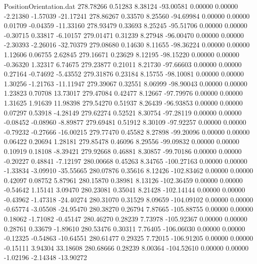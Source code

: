 \begin{filecontents}{PositionOrientation.dat}
 278.78266    0.51283    8.38124   -93.00581    0.00000    0.00000   -2.21380   -1.57039  -21.17241
 278.86267    0.33570    8.25560   -94.69984    0.00000    0.00000    0.01709   -0.04359  -11.33160
 278.93479    0.33693    8.25245   -95.51706    0.00000    0.00000   -0.30715    0.33817   -6.10157
 279.01471    0.31239    8.27948   -96.00470    0.00000    0.00000   -2.30393   -2.26016  -32.70379
 279.08680    0.14630    8.11655   -98.36224    0.00000    0.00000    1.12606    0.06755    2.62845
 279.16671    0.23629    8.12195   -98.15220    0.00000    0.00000   -0.36320    1.32317    6.74675
 279.23877    0.21011    8.21730   -97.66603    0.00000    0.00000    0.27164   -0.74692   -5.43552
 279.31876    0.23184    8.15755   -98.10081    0.00000    0.00000    1.30256   -1.21763  -11.11947
 279.39067    0.32551    8.06999   -98.90043    0.00000    0.00000    1.23823    0.70708   13.73017
 279.47084    0.42477    8.12667   -97.79976    0.00000    0.00000    1.31625    1.91639   11.98398
 279.54270    0.51937    8.26439   -96.93853    0.00000    0.00000    0.07297    0.53918   -4.28149
 279.62274    0.52521    8.30754   -97.28119    0.00000    0.00000   -0.08452   -0.08960   -8.89877
 279.69481    0.51912    8.30109   -97.92257    0.00000    0.00000   -0.79232   -0.27666  -16.00215
 279.77470    0.45582    8.27898   -99.20096    0.00000    0.00000    0.06422    0.20694    1.28181
 279.85478    0.46096    8.29556   -99.09832    0.00000    0.00000    0.10919    0.18108   -8.39421
 279.92668    0.46881    8.30857   -99.70186    0.00000    0.00000   -0.20227    0.48841   -7.12197
 280.00668    0.45263    8.34765  -100.27163    0.00000    0.00000   -1.33834   -3.09910  -35.55665
 280.07876    0.35616    8.12426  -102.83462    0.00000    0.00000    0.42097    0.08752    5.87961
 280.15870    0.38981    8.13126  -102.36459    0.00000    0.00000   -0.54642    1.15141    3.09470
 280.23081    0.35041    8.21428  -102.14144    0.00000    0.00000   -0.43962   -1.47318  -24.40274
 280.31070    0.31529    8.09659  -104.09102    0.00000    0.00000   -0.65774   -3.05508  -24.95470
 280.38270    0.26794    7.87665  -105.88755    0.00000    0.00000    0.18062   -1.71082   -0.45147
 280.46270    0.28239    7.73978  -105.92367    0.00000    0.00000    0.28761    0.33679   -1.89610
 280.53476    0.30311    7.76405  -106.06030    0.00000    0.00000   -0.12325   -0.54863  -10.64551
 280.61477    0.29325    7.72015  -106.91205    0.00000    0.00000   -0.15111    3.94304   33.18608
 280.68666    0.28239    8.00364  -104.52610    0.00000    0.00000   -1.02196   -2.14348  -13.90272

\end{filecontents}
